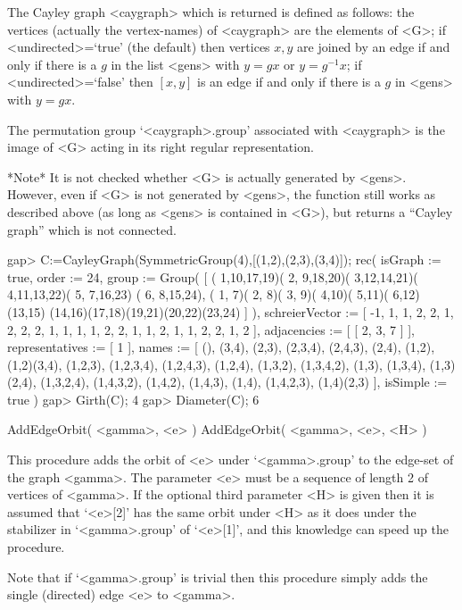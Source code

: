 The Cayley graph  <caygraph>  which is returned is defined as follows:
the vertices (actually the vertex-names) of <caygraph>  are the elements
of <G>;  if <undirected>=`true' (the default) then vertices $x,y$ are
joined by an edge if and only if there is a $g$ in the list <gens> with
$y=gx$ or $y=g^{-1}x$; if <undirected>=`false' then $[x,y]$ is an edge
if and only if there is a $g$ in <gens> with $y=gx$.

The permutation group `<caygraph>.group' associated with <caygraph> is
the image of <G> acting in its right regular representation.

*Note* It is not checked whether <G> is actually generated by <gens>.
However, even if <G> is not generated by <gens>, the function still
works as described above (as long as <gens> is contained in <G>), but
returns a ``Cayley graph'' which is not connected.

\beginexample
gap> C:=CayleyGraph(SymmetricGroup(4),[(1,2),(2,3),(3,4)]);
rec(
  isGraph := true,
  order := 24,
  group :=
   Group( [ ( 1,10,17,19)( 2, 9,18,20)( 3,12,14,21)( 4,11,13,22)( 5, 7,16,23)
        ( 6, 8,15,24), ( 1, 7)( 2, 8)( 3, 9)( 4,10)( 5,11)( 6,12)(13,15)
        (14,16)(17,18)(19,21)(20,22)(23,24) ] ),
  schreierVector := [ -1, 1, 1, 2, 2, 1, 2, 2, 2, 1, 1, 1, 1, 2, 2, 1, 1, 2,
      1, 1, 2, 2, 1, 2 ],
  adjacencies := [ [ 2, 3, 7 ] ],
  representatives := [ 1 ],
  names := [ (), (3,4), (2,3), (2,3,4), (2,4,3), (2,4), (1,2), (1,2)(3,4),
      (1,2,3), (1,2,3,4), (1,2,4,3), (1,2,4), (1,3,2), (1,3,4,2), (1,3),
      (1,3,4), (1,3)(2,4), (1,3,2,4), (1,4,3,2), (1,4,2), (1,4,3), (1,4),
      (1,4,2,3), (1,4)(2,3) ],
  isSimple := true )
gap> Girth(C);
4
gap> Diameter(C);
6
\endexample


\>AddEdgeOrbit( <gamma>, <e> )
\>AddEdgeOrbit( <gamma>, <e>, <H> )

This procedure adds the orbit of <e> under `<gamma>.group' to the
edge-set of the graph <gamma>. The parameter <e> must be a sequence of
length 2 of vertices of <gamma>. If the optional third parameter <H> is
given then it is assumed that `<e>[2]' has the same orbit under <H> as
it does under the stabilizer in `<gamma>.group' of `<e>[1]', and this
knowledge can speed up the procedure.

Note that if `<gamma>.group' is trivial then this procedure simply adds the
single (directed) edge <e> to <gamma>.

